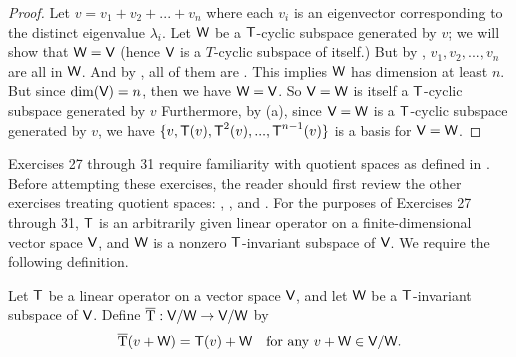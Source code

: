 \begin{proof}
Let \(v = v_1 + v_2 + ... + v_n\) where each \(v_i\) is an eigenvector corresponding to the distinct eigenvalue \(\lambda_i\).
Let \(\textsf{W}\) be a \(\textsf{T}\)-cyclic subspace generated by \(v\); we will show that \(\textsf{W} = \textsf{V}\) (hence \(\textsf{V}\) is a \(T\)-cyclic subspace of itself.)
But by , \(v_1, v_2, ..., v_n\) are all in \(\textsf{W}\).
And by , all of them are \LID{}.
This implies \(\textsf{W}\) has dimension at least \(n\).
But since \(\dim(\textsf{V}) = n\), then we have \(\textsf{W} = \textsf{V}\).
So \(\textsf{V} = \textsf{W}\) is itself a \(\textsf{T}\)-cyclic subspace generated by \(v\)
Furthermore, by (a), since \(\textsf{V} = \textsf{W}\) is a \(\textsf{T}\)-cyclic subspace generated by \(v\), we have \(\{ v, \textsf{T}(v), \textsf{T}^2(v), ..., \textsf{T}^{n - 1}(v) \}\) is a basis for \(\textsf{V} = \textsf{W}\).
\end{proof}

Exercises 27 through 31 require familiarity with quotient spaces as defined in .
Before attempting these exercises, the reader should first review the other exercises treating quotient spaces:
, , and .
For the purposes of Exercises 27 through 31, \(\textsf{T}\) is an arbitrarily given linear operator on a finite-dimensional vector space \(\textsf{V}\), and \(\textsf{W}\) is a nonzero \(\textsf{T}\)-invariant subspace of \(\textsf{V}\).
We require the following definition.

\newcommand{\Tover}{\mathrm{\overline{T}}}

\setcounter{additional definition}{3} %
\begin{additional definition} \label{adef 5.4}
Let \(\textsf{T}\) be a linear operator on a vector space \(\textsf{V}\), and let \(\textsf{W}\) be a \(\textsf{T}\)-invariant subspace of \(\textsf{V}\).
Define \(\Tover: \V/\W \to \V/\W\) by
\[
    \Tover(v + \W) = \T(v) + \W \quad \text{for any } v + \W \in \V/\W. 
\]
\end{additional definition}

